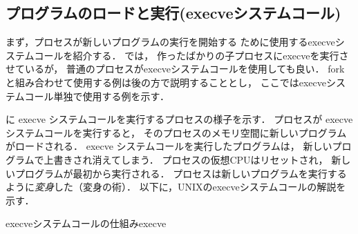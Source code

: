 
\subsection{プログラムのロードと実行(execveシステムコール)}
まず，プロセスが新しいプログラムの実行を開始する
ために使用するexecveシステムコールを紹介する．
では，
作ったばかりの子プロセスにexecveを実行させているが，
普通のプロセスがexecveシステムコールを使用しても良い．
forkと組み合わせて使用する例は後の方で説明することとし，
ここではexecveシステムコール単独で使用する例を示す．

に execve システムコールを実行するプロセスの様子を示す．
プロセスが execve システムコールを実行すると，
そのプロセスのメモリ空間に新しいプログラムがロードされる．
execve システムコールを実行したプログラムは，
新しいプログラムで上書きされ消えてしまう．
プロセスの仮想CPUはリセットされ，
新しいプログラムが最初から実行される．
プロセスは新しいプログラムを実行するように\emph{変身}した（変身の術）．
以下に，UNIXのexecveシステムコールの解説を示す．

         {execveシステムコールの仕組み}{execve}

